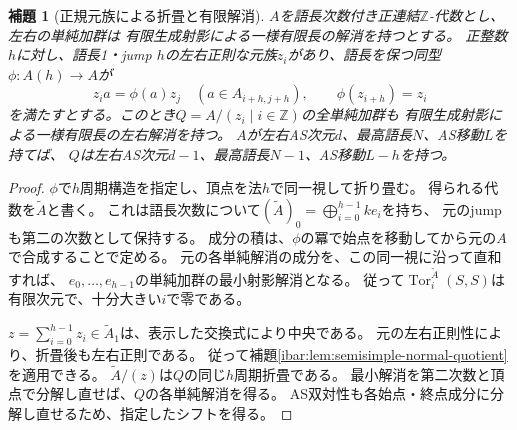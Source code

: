 \documentclass[11pt,a4paper]{ltjsarticle}
\newtheorem{lemma}[theorem]{補題}
\theoremstyle{definition}
\begin{document}
\begin{lemma}[正規元族による折畳と有限解消]
\label{ibar:lem:folded-quotient}
$A$を語長次数付き正連結$\mathbb Z$-代数とし、左右の単純加群は
有限生成射影による一様有限長の解消を持つとする。
正整数$h$に対し、語長1・jump $h$の左右正則な元族$z_i$があり、語長を保つ同型
$\phi:A(h)\longrightarrow A$が
\[
z_i a=\phi(a)z_j\quad(a\in A_{i+h,j+h}),
\qquad \phi(z_{i+h})=z_i
\]
を満たすとする。このとき$Q=A/(z_i\mid i\in\mathbb Z)$の全単純加群も
有限生成射影による一様有限長の左右解消を持つ。
$A$が左右AS次元$d$、最高語長$N$、AS移動$L$を持てば、
$Q$は左右AS次元$d-1$、最高語長$N-1$、AS移動$L-h$を持つ。
\end{lemma}
\begin{proof}
$\phi$で$h$周期構造を指定し、頂点を法$h$で同一視して折り畳む。
得られる代数を$\widetilde A$と書く。
これは語長次数について$(\widetilde A)_0=\bigoplus_{i=0}^{h-1}ke_i$を持ち、
元のjumpも第二の次数として保持する。
成分の積は、$\phi$の冪で始点を移動してから元の$A$で合成することで定める。
元の各単純解消の成分を、この同一視に沿って直和すれば、
$e_0,\ldots,e_{h-1}$の単純加群の最小射影解消となる。
従って$\operatorname{Tor}^{\widetilde A}_i(S,S)$は有限次元で、十分大きい$i$で零である。

$z=\sum_{i=0}^{h-1}z_i\in\widetilde A_1$は、表示した交換式により中央である。
元の左右正則性により、折畳後も左右正則である。
従って補題\ref{ibar:lem:semisimple-normal-quotient}を適用できる。
$\widetilde A/(z)$は$Q$の同じ$h$周期折畳である。
最小解消を第二次数と頂点で分解し直せば、$Q$の各単純解消を得る。
AS双対性も各始点・終点成分に分解し直せるため、指定したシフトを得る。
\end{proof}
\end{document}
